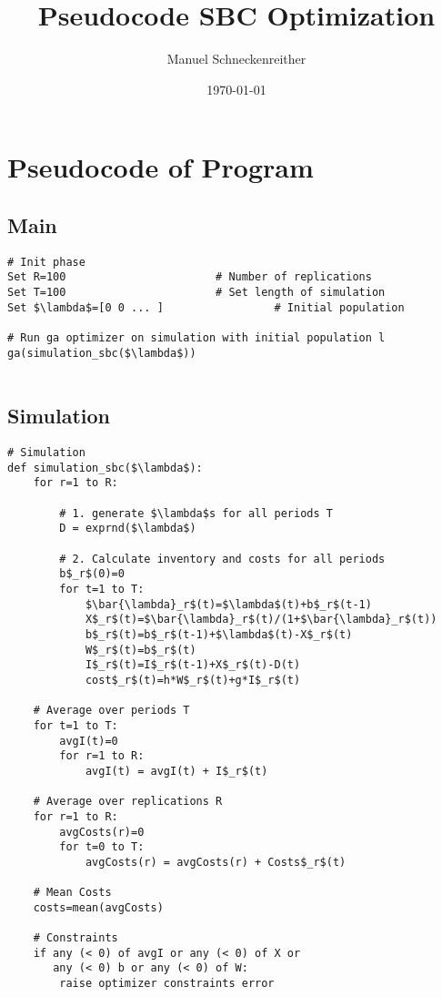 \documentclass{article}
\author{Manuel Schneckenreither}
\date{\today}
\title{Pseudocode SBC Optimization}
\begin{document}
\maketitle


\section{Pseudocode of Program}
\label{sec:org5ad05f7}


\subsection{Main}
\label{sec:orga14c961}

\lstset{language=Python,label= ,caption= ,captionpos=b,numbers=none}
\begin{lstlisting}
# Init phase
Set R=100                       # Number of replications
Set T=100                       # Set length of simulation
Set $\lambda$=[0 0 ... ]                 # Initial population

# Run ga optimizer on simulation with initial population l
ga(simulation_sbc($\lambda$))


\end{lstlisting}

\vspace{1cm}
\subsection{Simulation}
\label{sec:orge920127}

\lstset{language=Python,label= ,caption= ,captionpos=b,numbers=none}
\begin{lstlisting}
# Simulation
def simulation_sbc($\lambda$):
    for r=1 to R:

        # 1. generate $\lambda$s for all periods T
        D = exprnd($\lambda$)

        # 2. Calculate inventory and costs for all periods
        b$_r$(0)=0
        for t=1 to T:
            $\bar{\lambda}_r$(t)=$\lambda$(t)+b$_r$(t-1)
            X$_r$(t)=$\bar{\lambda}_r$(t)/(1+$\bar{\lambda}_r$(t))
            b$_r$(t)=b$_r$(t-1)+$\lambda$(t)-X$_r$(t)
            W$_r$(t)=b$_r$(t)
            I$_r$(t)=I$_r$(t-1)+X$_r$(t)-D(t)
            cost$_r$(t)=h*W$_r$(t)+g*I$_r$(t)

    # Average over periods T
    for t=1 to T:
        avgI(t)=0
        for r=1 to R:
            avgI(t) = avgI(t) + I$_r$(t)

    # Average over replications R
    for r=1 to R:
        avgCosts(r)=0
        for t=0 to T:
            avgCosts(r) = avgCosts(r) + Costs$_r$(t)

    # Mean Costs
    costs=mean(avgCosts)

    # Constraints
    if any (< 0) of avgI or any (< 0) of X or
       any (< 0) b or any (< 0) of W:
        raise optimizer constraints error

\end{lstlisting}
\end{document}
